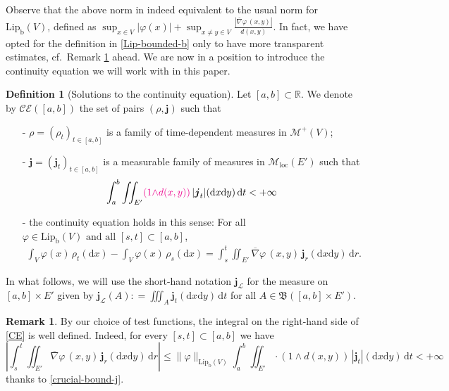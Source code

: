\documentclass[11pt,reqno]{amsart}
\numberwithin{equation}{section}
\newcommand{\CE}[2]{\calC \calE([#1,#2])}
\newcommand{\R}{\mathbb{R}}
\newcommand{\calC}{\mathcal{C}}
\newcommand{\calE}{\mathcal{E}}
\newcommand{\calM}{\mathcal{M}}
\newcommand{\scrL}{\mathscr{L}}
\newcommand{\Lip}{\mathrm{Lip}}
\newcommand{\dnabla}{\overline\nabla}
\newcommand{\dd}{\mathrm{d}}
\theoremstyle{definition}
\newtheorem{definition}[theorem]{Definition}
\newtheorem{remark}[theorem]{Remark}
\def\dd{\mathrm{d}}
\newcommand{\frB}{\mathfrak B}
\newcommand{\Lebone}{\scrL}
\newcommand{\bj}{{\boldsymbol j}}
\newcommand{\jj}{{\boldsymbol{j}}}
\newcommand{\Ed}{{E'}}
\newcommand{\RCR}{\color{magenta}}
\newcommand{\RNEW}{\color{black}} %
\newcommand{\EEE}{\color{black}}
\numberwithin{equation}{section}
\begin{document}
\RNEW Observe that the above norm in indeed equivalent to the usual norm for $\Lip_{\mathrm{b}}(V)$, defined as 
 $ \sup_{x\in V} |\varphi(x)| +  \sup_{x \neq y \in V} \frac{|\dnabla\varphi\,(x,y)|}{d(x,y)}$.
 In fact, we have opted for the definition in 
 \eqref{Lip-bounded-b} only to have more transparent estimates, cf.\  Remark \ref{rmk:lip-test-functions} ahead. \EEE
We are now in a position to introduce the continuity equation we will work with in this paper.
\begin{definition}[Solutions to the continuity equation]
\label{def:CE}
Let $[a,b] \subset \R$.
We denote by $\CE ab$  the set of pairs $(\rho,\jj)$ such that
\begin{itemize}
    \item[-] $\rho= (\rho_t)_{t\in [a,b]} $ is a family of time-dependent measures in $\mathcal{M}^+(V)$;
    \item[-] $\jj = (\jj_t)_{t\in [a,b]}$ is a measurable family of measures in  $\calM_{\mathrm{loc}}(\Ed)$ such that 
    \begin{equation}
    \label{crucial-bound-j}
\int_a^b \iint_\Ed \RCR (1{\wedge}d(x,y))\EEE \, |\jj_t|(\dd x \dd y)\,\dd t<+\infty
    \end{equation}
    \item[-] the continuity equation holds in this sense: For all $\varphi \in \Lip_{\mathrm{b}}(V) \text{ and all } [s,t]\subset [a,b]$,
    \begin{equation}
    \label{CE}
   \begin{aligned}
		\int_V \varphi(x)\, \rho_t(\dd x)  - \int_V \varphi(x)\, \rho_s(\dd x)   = \int_s^t \iint_\Ed \dnabla\varphi\,(x,y)\,\jj_r(\dd x\dd y)\,\dd r.
  \end{aligned}
	\end{equation}
\end{itemize}	
In what follows, we will use the  short-hand notation $\bj_{\Lebone}$ for the measure on $[a,b]\times E'$ given by 
$\bj_{\Lebone}(A): = \iiint_{A} \bj_t(\dd x \dd y) \, \dd t$ for all $A\in \frB([a,b]{\times} E')$. 
\end{definition}
\RNEW 
\begin{remark}
\label{rmk:lip-test-functions}
\upshape
By our choice of test functions, the integral on the right-hand side of \eqref{CE} is well defined. Indeed, for every $[s,t]\subset [a,b]$ we have 
\begin{equation}
\label{obvious-estimate}
\left| \int_s^t \iint_\Ed \dnabla\varphi\,(x,y)\,\jj_r(\dd x\dd y)\,\dd r \right| \leq \| \varphi \|_{\Lip_{\mathrm{b}}(V)} \int_a^b 
 \iint_\Ed  \cdot (1{\wedge}d(x,y))   \, |\jj_t|(\dd x \dd y)\,\dd t<+\infty
\end{equation}
thanks to \eqref{crucial-bound-j}.
\end{remark} \EEE
\end{document}
